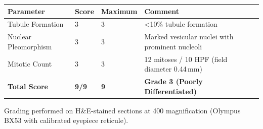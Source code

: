 \documentclass[11pt,a4paper]{article}
\begin{document}
\begin{tcolorbox}[sectionbox, title={\faStar\quad Histological Grading --- Nottingham (Elston--Ellis)}]

\renewcommand{\arraystretch}{1.4}
\begin{tabularx}{\linewidth}{L{4.5cm} C{2.5cm} C{2.5cm} X}
  \toprule
  \textbf{Parameter} & \textbf{Score} & \textbf{Maximum} & \textbf{Comment} \\
  \midrule
  Tubule Formation & 3 & 3 & \textless{}10\%{} tubule formation \\
  Nuclear Pleomorphism & 3 & 3 & Marked vesicular nuclei with prominent nucleoli \\
  Mitotic Count & 3 & 3 & 12 mitoses / 10 HPF (field diameter 0.44\,mm) \\
  \midrule
  \textbf{Total Score} & \textbf{9/9} & \textbf{9} & \textbf{Grade 3 (Poorly Differentiated)} \\
  \bottomrule
\end{tabularx}

\vspace{4pt}
{\footnotesize\color{PathMidGray} Grading performed on H\&{}E-stained sections at 400\texttimes{} magnification
(Olympus BX53 with calibrated eyepiece reticule).}
\end{tcolorbox}

\vspace{4pt}
\end{document}
